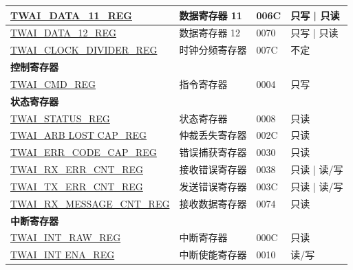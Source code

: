\begin{longtable}{ | p{6cm} | p{6cm} | p{1.3cm} | p{2cm} | }
\hyperref[regdesc:TWAIDATA11REG]{TWAI\_DATA\_11\_REG} & 数据寄存器 11 & \hexprefix{}006C & 只写 | 只读 \\ \hline
\hyperref[regdesc:TWAIDATA12REG]{TWAI\_DATA\_12\_REG} & 数据寄存器 12 & \hexprefix{}0070 & 只写 | 只读 \\ \hline
\hyperref[regdesc:TWAICLOCKDIVIDERREG]{TWAI\_CLOCK\_DIVIDER\_REG} & 时钟分频寄存器 & \hexprefix{}007C & 不定 \\ \hline
\multicolumn{4}{|l|}{\textbf{控制寄存器}} \\ \hline
\hyperref[regdesc:TWAICMDREG]{TWAI\_CMD\_REG} & 指令寄存器 & \hexprefix{}0004 & 只写 \\ \hline
\multicolumn{4}{|l|}{\textbf{状态寄存器}} \\ \hline
\hyperref[regdesc:TWAISTATUSREG]{TWAI\_STATUS\_REG} & 状态寄存器 & \hexprefix{}0008 & 只读 \\ \hline
\hyperref[regdesc:TWAIARB LOST CAPREG]{TWAI\_ARB LOST CAP\_REG} & 仲裁丢失寄存器 & \hexprefix{}002C & 只读 \\ \hline
\hyperref[regdesc:TWAIERRCODECAPREG]{TWAI\_ERR\_CODE\_CAP\_REG} & 错误捕获寄存器 & \hexprefix{}0030 & 只读 \\ \hline
\hyperref[regdesc:TWAIRXERRCNTREG]{TWAI\_RX\_ERR\_CNT\_REG} & 接收错误寄存器 & \hexprefix{}0038 & 只读 | 读/写 \\ \hline
\hyperref[regdesc:TWAITXERRCNTREG]{TWAI\_TX\_ERR\_CNT\_REG} & 发送错误寄存器 & \hexprefix{}003C & 只读 | 读/写 \\ \hline
\hyperref[regdesc:TWAIRXMESSAGECNTREG]{TWAI\_RX\_MESSAGE\_CNT\_REG} & 接收数据寄存器 & \hexprefix{}0074 & 只读 \\ \hline
\multicolumn{4}{|l|}{\textbf{中断寄存器}} \\ \hline
\hyperref[regdesc:TWAIINTRAWREG]{TWAI\_INT\_RAW\_REG} & 中断寄存器 & \hexprefix{}000C & 只读 \\ \hline
\hyperref[regdesc:TWAIINT ENAREG]{TWAI\_INT ENA\_REG} & 中断使能寄存器 & \hexprefix{}0010 & 读/写 \\ \hline
\end{longtable}
